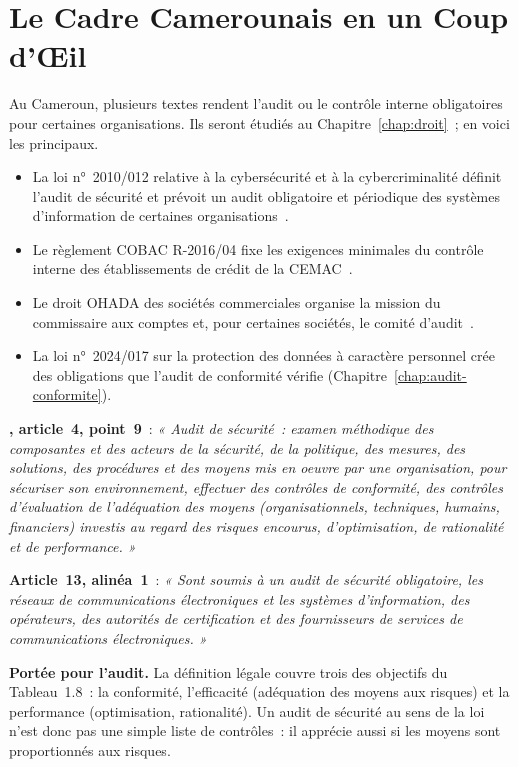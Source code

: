 \section{Le Cadre Camerounais en un Coup d'Œil}
\label{sec:c01-cadre}

Au Cameroun, plusieurs textes rendent l'audit ou le contrôle interne
obligatoires pour certaines organisations. Ils seront étudiés au
Chapitre~\ref{chap:droit}~; en voici les principaux.

\begin{itemize}
    \item La loi n°~2010/012 relative à la cybersécurité et à la
          cybercriminalité définit l'audit de sécurité et prévoit un audit
          obligatoire et périodique des systèmes d'information de certaines
          organisations~\cite{loi2010012}.
    \item Le règlement COBAC R-2016/04 fixe les exigences minimales du
          contrôle interne des établissements de crédit de la
          CEMAC~\cite{cobac2016r04}.
    \item Le droit OHADA des sociétés commerciales organise la mission du
          commissaire aux comptes et, pour certaines sociétés, le comité
          d'audit~\cite{ohada2014auscgie}.
    \item La loi n°~2024/017 sur la protection des données à caractère
          personnel crée des obligations que l'audit de conformité vérifie
          (Chapitre~\ref{chap:audit-conformite}).
\end{itemize}

\begin{boxjuris}
\textbf{, article~4, point~9}~: \textit{« Audit de
sécurité~: examen méthodique des composantes et des acteurs de la sécurité,
de la politique, des mesures, des solutions, des procédures et des moyens
mis en oeuvre par une organisation, pour sécuriser son environnement,
effectuer des contrôles de conformité, des contrôles d'évaluation de
l'adéquation des moyens (organisationnels, techniques, humains,
financiers) investis au regard des risques encourus, d'optimisation, de
rationalité et de performance. »}

\medskip
\textbf{Article~13, alinéa~1}~: \textit{« Sont soumis à un audit de sécurité
obligatoire, les réseaux de communications électroniques et les systèmes
d'information, des opérateurs, des autorités de certification et des
fournisseurs de services de communications électroniques. »}

\medskip
\textbf{Portée pour l'audit.} La définition légale couvre trois des
objectifs du Tableau~1.8~: la conformité, l'efficacité (adéquation des
moyens aux risques) et la performance (optimisation, rationalité). Un
audit de sécurité au sens de la loi n'est donc pas une simple liste de
contrôles~: il apprécie aussi si les moyens sont proportionnés aux
risques.
\end{boxjuris}


